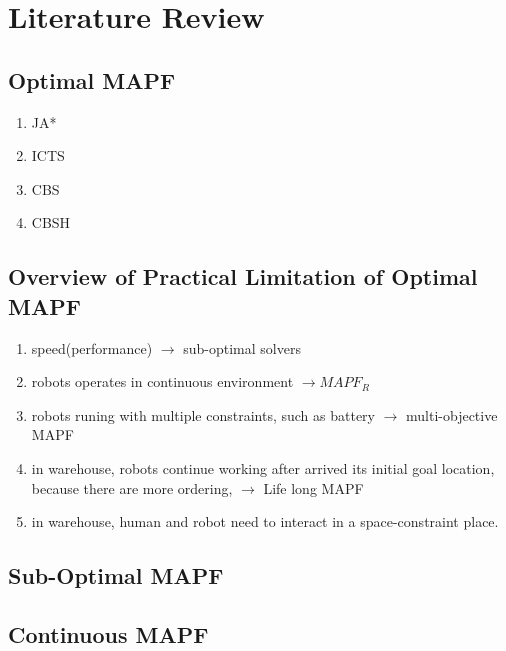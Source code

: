 \chapter{Literature Review}
\section{Optimal MAPF}
\begin{enumerate}
    \item JA*
    \item ICTS
    \item CBS
    \item CBSH
\end{enumerate}
\section{Overview of Practical Limitation of Optimal MAPF}
\begin{enumerate}
    \item speed(performance)  $\rightarrow$ sub-optimal solvers
    \item robots operates in continuous environment $\rightarrow MAPF_R$
    \item robots runing with multiple constraints, such as battery $\rightarrow$ multi-objective MAPF
    \item in warehouse, robots continue working after arrived its initial goal location, because there are more ordering, $\rightarrow$ Life long MAPF
    \item in warehouse, human and robot need to interact in a space-constraint place. 
\end{enumerate}
\section{Sub-Optimal MAPF}
\section{Continuous MAPF}